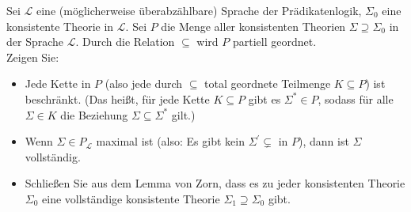 
\begin{exercise}[117]

Sei $\mathscr{L}$ eine (möglicherweise überabzählbare) Sprache der Prädikatenlogik,
$\Sigma_0$ eine konsistente Theorie in $\mathscr{L}$. Sei $P$ die Menge aller konsistenten
Theorien $\Sigma \supseteq \Sigma_0$ in der Sprache $\mathscr{L}$. Durch die
Relation $\subseteq$ wird $P$ partiell geordnet. \\
Zeigen Sie:
\begin{itemize}
  \item Jede Kette in $P$ (also jede durch $\subseteq$ total geordnete Teilmenge $K \subseteq P$)
  ist beschränkt. (Das heißt, für jede Kette $K \subseteq P$ gibt es $\Sigma^* \in P$,
  sodass für alle $\Sigma \in K$ die Beziehung $\Sigma \subseteq \Sigma^*$ gilt.)
  \item Wenn $\Sigma \in P_{\mathscr{L}}$ maximal ist (also: Es gibt kein
  $\Sigma^{\prime} \subsetneq$ in $P$), dann ist $\Sigma$ vollständig.
  \item Schließen Sie aus dem Lemma von Zorn, dass es zu jeder konsistenten Theorie
  $\Sigma_0$ eine vollständige konsistente Theorie $\Sigma_1 \supseteq \Sigma_0$ gibt.
\end{itemize}
\end{exercise}


\begin{solution}

\phantom{}

\end{solution}

